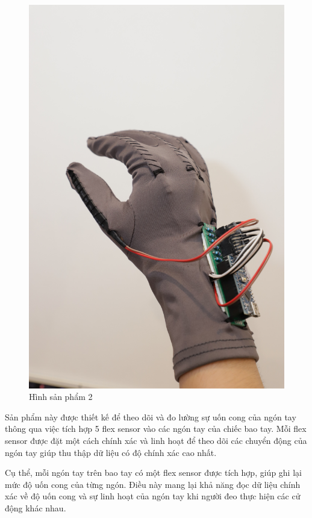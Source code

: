 \begin{figure}[H]
    \centering
    \includegraphics[width=13cm]{Images/Experimental results/overview1.JPG}
\caption{Hình sản phẩm 2}
\end{figure}

\indent Sản phẩm này được thiết kế để theo dõi và đo lường sự uốn cong của ngón tay thông qua việc tích hợp 5 flex sensor vào các ngón tay của chiếc bao tay. Mỗi flex sensor được đặt một cách chính xác và linh hoạt để theo dõi các chuyển động của ngón tay giúp thu thập dữ liệu có độ chính xác cao nhất.

\indent Cụ thể, mỗi ngón tay trên bao tay có một flex sensor được tích hợp, giúp ghi lại mức độ uốn cong của từng ngón. Điều này mang lại khả năng đọc dữ liệu chính xác về độ uốn cong và sự linh hoạt của ngón tay khi người đeo thực hiện các cử động khác nhau.


